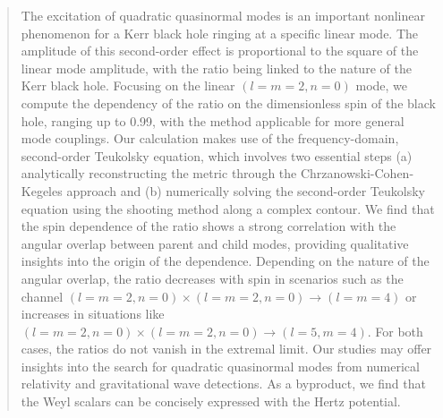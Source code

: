 \documentclass[aps,prd,amsmath,floats,floatfix, twocolumn,
superscriptaddress,nofootinbib,showpacs]{revtex4-1}
\newcommand{\red}{\textcolor{red}}
\begin{document}
\begin{abstract}
The excitation of quadratic quasinormal modes is an important nonlinear phenomenon for a Kerr black hole ringing at a specific linear mode. The amplitude of this second-order effect is proportional to the square of the linear mode amplitude, with the ratio being linked to the nature of the Kerr black hole. Focusing on the linear $(l=m=2,n=0)$ mode, we compute the dependency of the ratio on the dimensionless spin of the black hole, ranging up to 0.99, with the method applicable for more general mode couplings. Our calculation makes use of the frequency-domain, second-order Teukolsky equation, which involves two essential steps (a) analytically reconstructing the metric through the Chrzanowski-Cohen-Kegeles approach and (b) numerically solving the second-order Teukolsky equation using the shooting method along a complex contour. We find that the spin dependence of the ratio shows a strong correlation with the angular overlap between parent and child modes, providing qualitative insights into the origin of the dependence. Depending on the nature of the angular overlap, the ratio decreases with spin in scenarios such as the channel $(l=m=2,n=0)\times(l=m=2,n=0)\to(l=m=4)$ or increases in situations like $(l=m=2,n=0)\times(l=m=2,n=0)\to(l=5,m=4)$. For both cases, the ratios do not vanish in the extremal limit. Our studies may offer insights into the search for quadratic quasinormal modes from numerical relativity and gravitational wave detections. As a byproduct, we find that the Weyl scalars can be concisely expressed with the Hertz potential.
\end{abstract}

\maketitle

\end{document}

